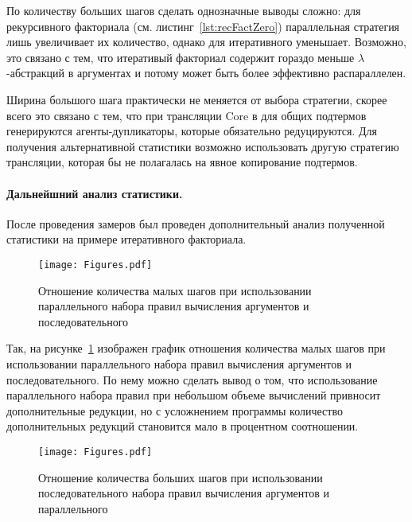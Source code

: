 По количеству больших шагов сделать однозначные выводы сложно: для рекурсивного факториала (см. листинг~\ref{lst:recFactZero}) параллельная стратегия лишь увеличивает их количество, однако для итеративного уменьшает.
Возможно, это связано с тем, что итеративый факториал содержит гораздо меньше $\lambda$-абстракций в аргументах  и потому может быть более эффективно распараллелен.

Ширина большого шага практически не меняется от выбора стратегии, скорее всего это связано с тем, что при трансляции Core в \INs{} для общих подтермов генерируются агенты-дупликаторы, которые обязательно редуцируются.
Для получения альтернативной статистики возможно использовать другую стратегию трансляции, которая бы не полагалась на явное копирование подтермов.

\paragraph{Дальнейшний анализ статистики.}

После проведения замеров был проведен дополнительный анализ полученной статистики на примере итеративного факториала.

\begin{figure}
    \begin{center}
        \texttt{[image: Figures.pdf]}
    \end{center}
    \caption{Отношение количества малых шагов при использовании параллельного набора правил вычисления аргументов и последовательного}
    \label{fig:fact_total}
\end{figure}

Так, на рисунке~\ref{fig:fact_total} изображен график отношения количества малых шагов при использовании параллельного набора правил вычисления аргументов и последовательного.
По нему можно сделать вывод о том, что использование параллельного набора правил при небольшом объеме вычислений привносит дополнительные редукции, но с усложнением программы количество дополнительных редукций становится мало в процентном соотношении.

\begin{figure}
    \begin{center}
        \texttt{[image: Figures.pdf]}
    \end{center}
    \caption{Отношение количества больших шагов при использовании последовательного набора правил вычисления аргументов и параллельного}
    \label{fig:fact_height}
\end{figure}

